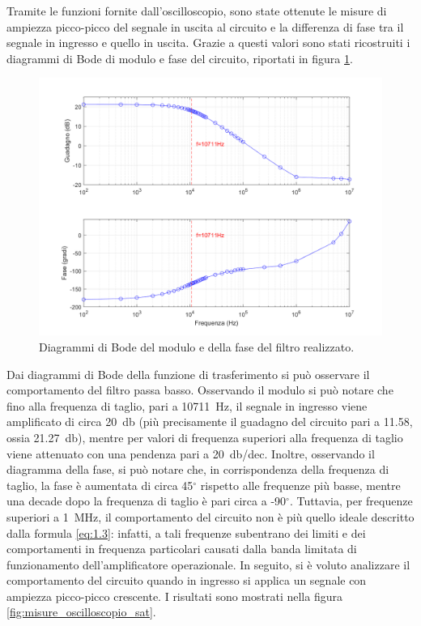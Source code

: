 \noindent
Tramite le funzioni fornite dall'oscilloscopio, sono state ottenute le misure di ampiezza picco-picco del segnale in uscita al circuito e la differenza di fase tra il segnale in ingresso e quello in uscita. Grazie a questi valori sono stati ricostruiti i diagrammi di Bode di modulo e fase del circuito, riportati in figura \ref{fig:diagrammi_di_Bode}.
\begin{figure}[h!]
	\centering
	\includegraphics[width=0.80\linewidth]{./ImageFiles/Laboratorio 1/Diagrammi di Bode.png}
	\caption{Diagrammi di Bode del modulo e della fase del filtro realizzato.}
	\label{fig:diagrammi_di_Bode}
\end{figure}
Dai diagrammi di Bode della funzione di trasferimento si può osservare il comportamento del filtro passa basso. Osservando il modulo si può notare che fino alla frequenza di taglio, pari a \SI{10711}{\hertz}, il segnale in ingresso viene amplificato di circa \SI{20}{\decibel} (più precisamente il guadagno del circuito pari a 11.58, ossia \SI{21.27}{\decibel}), mentre per valori di frequenza superiori alla frequenza di taglio viene attenuato con una pendenza pari a \SI{20}{\decibel}/dec. Inoltre, osservando il diagramma della fase, si può notare che, in corrispondenza della frequenza di taglio, la fase è aumentata di circa 45$^{\circ}$ rispetto alle frequenze più basse, mentre una decade dopo la frequenza di taglio è pari circa a -90$^{\circ}$.
Tuttavia, per frequenze superiori a \SI{1}{\mega\hertz}, il comportamento del circuito non è più quello ideale descritto dalla formula \ref{eq:1.3}: infatti, a tali frequenze subentrano dei limiti e dei comportamenti in frequenza particolari causati dalla banda limitata di funzionamento dell'amplificatore operazionale.
\clearpage
In seguito, si è voluto analizzare il comportamento del circuito quando in ingresso si applica un segnale con ampiezza picco-picco crescente. I risultati sono mostrati nella figura \ref{fig:misure_oscilloscopio_sat}.
